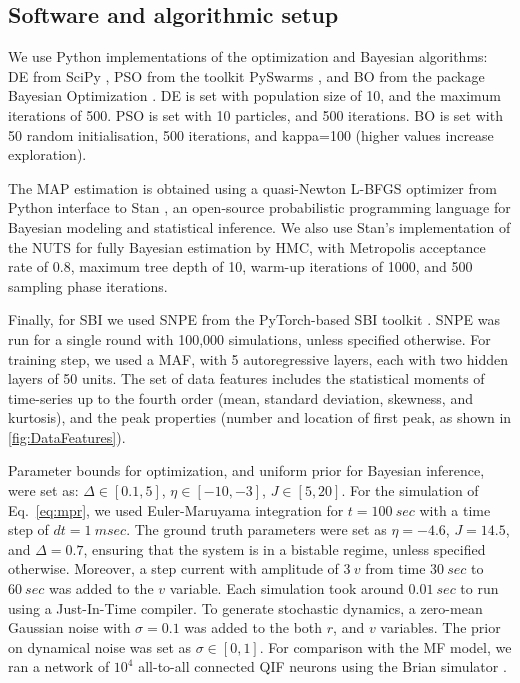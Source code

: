 \documentclass[preprint,11pt,authoryear]{elsarticle}
\begin{document}
\subsection{Software and algorithmic setup} 

We use Python implementations of the optimization and Bayesian algorithms: DE from SciPy \citep{Virtanen2020scipy}, PSO from the toolkit PySwarms \citep{Miranda2018pyswarms}, and BO from the package Bayesian Optimization \citep{Nogueira2014BO}. DE is set with population size of 10, and the maximum iterations of 500. PSO is set with 10 particles, and 500 iterations. BO is set with 50 random initialisation, 500 iterations, and kappa=100 (higher values increase exploration).

The MAP estimation is obtained using a quasi-Newton L-BFGS optimizer from Python interface to Stan \citep{Carpenter2017}, an open-source probabilistic programming language for Bayesian modeling and statistical inference. We also use Stan's implementation of the NUTS for fully Bayesian estimation by HMC, with Metropolis acceptance rate of 0.8, maximum tree depth of 10, warm-up iterations of 1000, and 500 sampling phase iterations. 

Finally, for SBI we used SNPE from the PyTorch-based SBI toolkit \citep{Tejero2020sbi}. SNPE was run for a single round with 100,000 simulations, unless specified otherwise. For training step, we used a MAF, with 5 autoregressive layers, each with two hidden layers of 50 units.
The set of data features includes the statistical moments of time-series up to the fourth order (mean, standard deviation, skewness, and kurtosis), and the peak properties (number and location of first peak, as shown in \autoref{fig:DataFeatures}).


Parameter bounds for optimization, and  uniform prior for Bayesian inference, were set as: $\Delta \in [0.1, 5]$, $\eta \in [-10, -3]$, $J \in [5, 20]$. For the simulation of Eq.~\ref{eq:mpr}, we used Euler-Maruyama integration for $t=100~sec$ with a time step of $dt=1~msec$. The ground truth parameters were set as $\eta=-4.6$, $J=14.5$, and $\Delta=0.7$, ensuring that the system is in a bistable regime, unless specified otherwise. Moreover, a step current with amplitude of $3~v$ from time $30~sec$ to $60~sec$ was added to the $v$ variable. Each simulation took around $0.01~sec$ to run using a Just-In-Time compiler.
To generate stochastic dynamics, a zero-mean Gaussian noise with $\sigma=0.1$ was added to the both $r$, and $v$ variables. The prior on dynamical noise was set as $\sigma \in [0, 1]$.
For comparison with the MF model, we ran a network of $10^4$ all-to-all connected QIF neurons using the Brian simulator \citep{Stimberg2019}.
 
\end{document}
